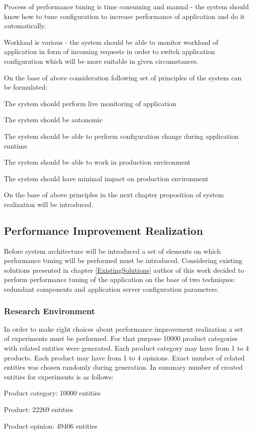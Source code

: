 \documentclass[10pt,a4paper]{article}
\let\tempone\itemize
\let\temptwo\enditemize
\renewenvironment{itemize}{\tempone\addtolength{\itemsep}{-0.4\baselineskip}}{\temptwo}
\begin{document}
Process of performance tuning is time consuming and manual - the system should know how to tune configuration to increase performance of application and do it automatically. 

Workload is various - the system should be able to monitor workload of application in form of incoming requests in order to switch application configuration which will be more suitable in given circumstances. 

On the base of above consideration following set of principles of the system can be formulated:

\begin{itemize}
\item The system should perform live monitoring of application
\item The system should be autonomic
\item The system should be able to perform configuration change during application runtime
\item The system should be able to work in production environment
\item The system should have minimal impact on production environment
\end{itemize}

On the base of above principles in the next chapter proposition of system realization will be introduced.  

\subsection{Performance Improvement Realization} \label{realization}

Before system architecture will be introduced a set of elements on which performance tuning will be performed must be introduced.  
Considering existing solutions presented in chapter \ref{ExistingSolutions} author of this work decided to perform performance tuning of the application on the base of two techniques: redundant components and application server configuration parameters. 

\subsubsection{Research Environment}

In order to make right choices about performance improvement realization a set of experiments must be performed. 
For that purpose 10000 product categories with related entities were generated. Each product category may have from 1 to 4 products. Each product may have from 1 to 4 opinions. Exact number of related entities was chosen randomly during generation. In summary number of created entities for experiments is as follows:
\begin{itemize}
\item Product category: 10000 entities
\item Product: 22269 entities
\item Product opinion: 49406 entities
\end{itemize}  
\end{document}
